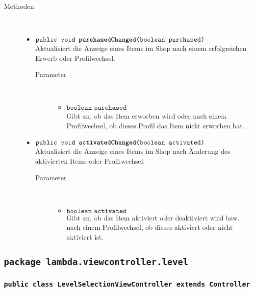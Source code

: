 \begin{description}
\item[Methoden] \hfill \\
	\vspace{-.8cm}
	\begin{itemize}
		\item $\texttt{public void \textbf{purchasedChanged}(boolean purchased)}$ \\ Aktualisiert die Anzeige eines Items im Shop nach einem erfolgreichen Erwerb oder Profilwechsel.	
		\begin{description}
			\item[Parameter] \hfill \\
			\vspace{-.8cm}
			\begin{itemize}
				\item $\texttt{boolean purchased}$ \\ Gibt an, ob das Item erworben wird oder nach einem Profilwechsel, ob dieses Profil das Item nicht erworben hat.
			\end{itemize}
			\end{description}
		
		\item $\texttt{public void \textbf{activatedChanged}(boolean activated)}$ \\ Aktualisiert die Anzeige eines Items im Shop nach Änderung des aktivierten Items oder Profilwechsel.
		\begin{description}
			\item[Parameter] \hfill \\
			\vspace{-.8cm}
			\begin{itemize}
				\item $\texttt{boolean activated}$ \\ Gibt an, ob das Item aktiviert oder deaktiviert wird bzw. nach einem Profilwechsel, ob dieses aktiviert oder nicht aktiviert ist.
			\end{itemize}
			\end{description}

		\end{itemize}
	\end{description}
	
\subsection{\texttt{package lambda.viewcontroller.level}}
	
	\subsubsection{\normalfont \texttt{public class \textbf{LevelSelectionViewController} extends Controller}}

